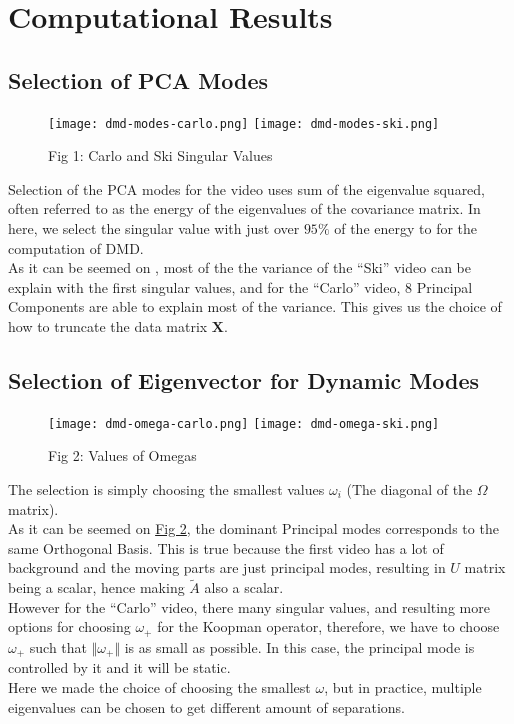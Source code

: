 \documentclass{article}
\begin{document}
\section{Computational Results}
    \subsection*{Selection of PCA Modes}
        \begin{figure}[h]
        \hspace{-2em}
        \texttt{[image: dmd-modes-carlo.png]}
        \texttt{[image: dmd-modes-ski.png]}
        \caption{Fig 1: Carlo and Ski Singular Values}
        \label{fig:1}
        \end{figure}
    \hspace{1.1em}
    Selection of the PCA modes for the video uses sum of the eigenvalue squared, often referred to as the energy of the eigenvalues of the covariance matrix. In here, we select the singular value with just over $95\%$ of the energy to for the computation of DMD.
    \\
    As it can be seemed on , most of the the variance of the ``Ski'' video can be explain with the first singular values, and for the ``Carlo'' video, 8 Principal Components are able to explain most of the variance. This gives us the choice of how to truncate the data matrix $\mathbf{X}$. 
    
    \subsection*{Selection of Eigenvector for Dynamic Modes}
        \begin{figure}[h]
            \texttt{[image: dmd-omega-carlo.png]}
            \texttt{[image: dmd-omega-ski.png]}
            \caption{Fig 2: Values of Omegas}
            \label{fig:2}
        \end{figure}
        \hspace{1.1em}
        The selection is simply choosing the smallest values $\omega_i$ (The diagonal of the $\Omega$ matrix).
        \\
        As it can be seemed on \hyperref[fig:2]{Fig 2}, the dominant Principal modes corresponds to the same Orthogonal Basis. This is true because the first video has a lot of background and the moving parts are just principal modes, resulting in $U$ matrix being a scalar, hence making $\widetilde{A}$ also a scalar. 
        \\
        However for the ``Carlo'' video, there many singular values, and resulting more options for choosing $\omega_+$ for the Koopman operator, therefore, we have to choose $\omega_+$ such that $\Vert \omega_+\Vert$ is as small as possible. In this case, the principal mode is controlled by it and it will be static. 
        \\
        Here we made the choice of choosing the smallest $\omega$, but in practice, multiple eigenvalues can be chosen to get different amount of separations. 
\end{document}
